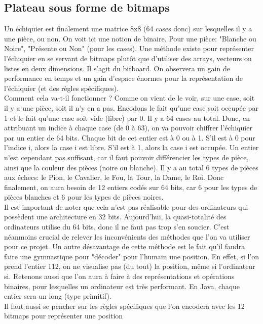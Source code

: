 \documentclass{article}
\begin{document}
\subsection{Plateau sous forme de bitmaps}
Un échiquier est finalement une matrice 8x8 (64 cases donc) sur lesquelles il y a une pièce, ou non. On voit ici une
notion de binaire. Pour une pièce: "Blanche ou Noire", "Présente ou Non" (pour les cases). Une méthode existe pour
représenter l'échiquier en se servant de bitmaps plutôt que d'utiliser des arrays, vecteurs ou listes en deux dimensions.
Il s'agit du bitboard. On observera un gain de performance en temps et un gain d'espace énormes pour la représentation
de l'échiquier (et des règles spécifiques).\\
Comment cela va-t-il fonctionner ? Comme on vient de le voir, sur une case, soit il y a une pièce, soit il n'y en a pas.
Encodons le fait qu'une case soit occupée par 1 et le fait qu'une case soit vide (libre) par 0. Il y a 64 cases au total.
Donc, en attribuant un indice à chaque case (de 0 à 63), on va pouvoir chiffrer l'échiquier par un entier de 64 bits.
Chaque bit de cet entier est à 0 ou à 1. S'il est à 0 pour l'indice i, alors la case i est libre. S'il est à 1, alors la
case i est occupée. Un entier n'est cependant pas suffisant, car il faut pouvoir différencier les types de pièce, ainsi
que la couleur des pièces (noire ou blanche). Il y a au total 6 types de pièces aux échecs: le Pion, le Cavalier, le Fou,
la Tour, la Dame, le Roi. Donc finalement, on aura besoin de 12 entiers codés sur 64 bits, car 6 pour les types de pièces
blanches et 6 pour les types de pièces noires.
\\Il est important de noter que cela n'est pas réalisable pour des ordinateurs qui possèdent une architecture en 32 bits.
Aujourd'hui, la quasi-totalité des ordinateurs utilise du 64 bits, donc il ne faut pas trop s'en soucier. C'est néanmoins
crucial de relever les inconvénients des méthodes que l'on va utiliser pour ce projet. Un autre désavantage de cette méthode
est le fait qu'il faudra faire une gymnastique pour "décoder" pour l'humain une position. En effet, si l'on prend l'entier
112, on ne visualise pas (du tout) la position, même si l'ordinateur si.
Retenons aussi que l'on aura à faire à des représentations et opérations binaires, pour lesquelles un ordinateur est très
performant. En Java, chaque entier sera un long (type primitif).
\\Il faut aussi se pencher sur les règles spécifiques que l'on encodera avec les 12 bitmaps pour représenter une position
\end{document}
